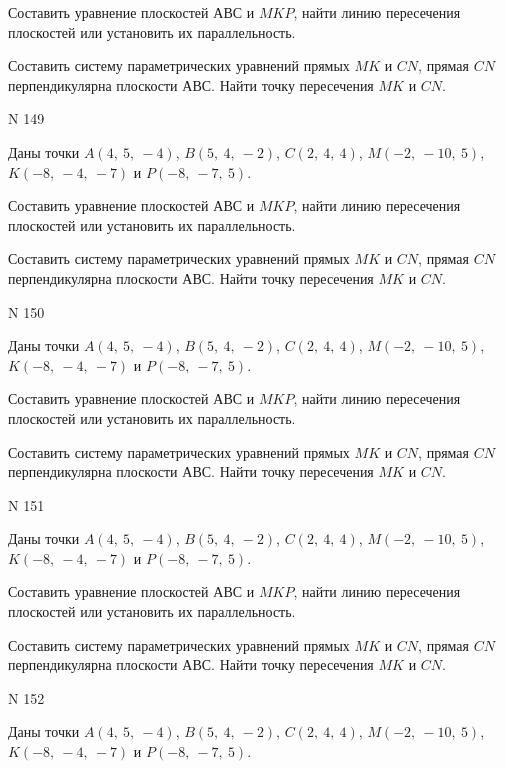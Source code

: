 \documentclass[11pt]{report}
\begin{document}
Составить уравнение плоскостей $АВС$ и $MKP$,
найти линию пересечения плоскостей или установить их параллельность.

Составить систему параметрических уравнений прямых $MK$ и $CN$,
прямая $CN$ перпендикулярна плоскости $АВС$. 
Найти точку пересечения $MK$ и $CN$.



 N 149

Даны точки $A\left( 4, \  5, \  -4\right)$, $B\left( 5, \  4, \  -2\right)$, $C\left( 2, \  4, \  4\right)$, $M\left( -2, \  -10, \  5\right)$, $K\left( -8, \  -4, \  -7\right)$ и $P\left( -8, \  -7, \  5\right)$.


Составить уравнение плоскостей $АВС$ и $MKP$,
найти линию пересечения плоскостей или установить их параллельность.

Составить систему параметрических уравнений прямых $MK$ и $CN$,
прямая $CN$ перпендикулярна плоскости $АВС$. 
Найти точку пересечения $MK$ и $CN$.



 N 150

Даны точки $A\left( 4, \  5, \  -4\right)$, $B\left( 5, \  4, \  -2\right)$, $C\left( 2, \  4, \  4\right)$, $M\left( -2, \  -10, \  5\right)$, $K\left( -8, \  -4, \  -7\right)$ и $P\left( -8, \  -7, \  5\right)$.


Составить уравнение плоскостей $АВС$ и $MKP$,
найти линию пересечения плоскостей или установить их параллельность.

Составить систему параметрических уравнений прямых $MK$ и $CN$,
прямая $CN$ перпендикулярна плоскости $АВС$. 
Найти точку пересечения $MK$ и $CN$.



 N 151

Даны точки $A\left( 4, \  5, \  -4\right)$, $B\left( 5, \  4, \  -2\right)$, $C\left( 2, \  4, \  4\right)$, $M\left( -2, \  -10, \  5\right)$, $K\left( -8, \  -4, \  -7\right)$ и $P\left( -8, \  -7, \  5\right)$.


Составить уравнение плоскостей $АВС$ и $MKP$,
найти линию пересечения плоскостей или установить их параллельность.

Составить систему параметрических уравнений прямых $MK$ и $CN$,
прямая $CN$ перпендикулярна плоскости $АВС$. 
Найти точку пересечения $MK$ и $CN$.



 N 152

Даны точки $A\left( 4, \  5, \  -4\right)$, $B\left( 5, \  4, \  -2\right)$, $C\left( 2, \  4, \  4\right)$, $M\left( -2, \  -10, \  5\right)$, $K\left( -8, \  -4, \  -7\right)$ и $P\left( -8, \  -7, \  5\right)$.
\end{document}
